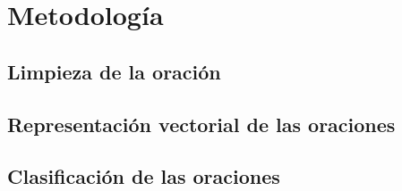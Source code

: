 \documentclass[conference]{IEEEtran}
\begin{document}



\section{Metodología} \label{sec:metodologia}

    

    
    \subsection{Limpieza de la oración}
    
        
    
    
    
    
    \subsection{Representación vectorial de las oraciones}
    
        
    
    
    
    
    \subsection{Clasificación de las oraciones}
    
        
    
    
\end{document}

